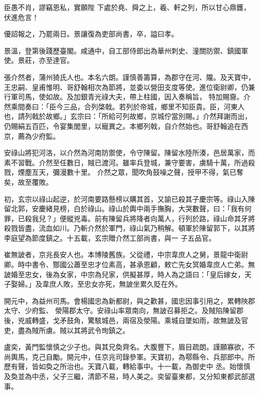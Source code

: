 \begin{pinyinscope}
 臣愚不肖，謬竊恩私，實願陛
 下處於堯、舜之上，羲、軒之列，所以甘心鼎鑊，伏進危言！



 優詔報之，乃罷兩日。景讓復為吏部尚書，卒，謚曰孝。



 景溫，登第後踐歷臺閣。咸通中，自工部侍郎出為華州刺史、潼關防禦、鎮國軍使。景莊，亦至達官。



 張介然者，蒲州猗氏人也。本名六朗。謹慎善籌算，為郡守在河、隴。及天寶中，王忠嗣、皇甫惟明、哥舒翰相次為節將，並委以營田支度等使。進位衛尉卿，仍兼行軍司馬，使如故。及加銀青光祿大夫，帶上柱國，因入奏稱旨，
 特加賜齎。介然乘間奏曰：「臣今三品，合列棨戟。若列於帝城，鄉里不知臣貴。臣，河東人也，請列戟於故鄉。」玄宗曰：「所給可列故鄉，京城佇當別賜。」介然拜謝而出，仍賜絹五百匹，令宴集閭里，以寵異之。本鄉列戟，自介然始也。哥舒翰追在西京，薦為少府監。



 安祿山將犯河洛，以介然為河南防禦使，令守陳留。陳留水陸所湊，邑居萬家，而素不習戰。介然至任數日，賊已渡河。雖率兵登城，兼守要害，虜騎十萬，所過殺戮，煙塵亙天，彌漫數十里。
 介然之眾，聞吹角鼓噪之聲，授甲不得，氣已奪矣，故至覆敗。



 初，玄宗以祿山起逆，於河南要路懸榜以購其首，又諭已殺其子慶宗等。祿山入陳留北郭，安慶緒見榜，白於祿山。祿山於輿中兩手撫胸，大哭數聲，曰：「我有何罪，已殺我兒？」便縱兇毒。前有陳留兵將降者向萬人，行列於路，祿山命其牙將殺戮皆盡，流血如川。乃斬介然於軍門，祿山氣乃稍解。頓軍於陳留郭下，以其將李庭望為節度鎮之。十五載，玄宗贈介然工部尚書，與一
 子五品官。



 崔無詖者，京兆長安人也。本博陵舊族。父從禮，中宗韋庶人之舅，景龍中衛尉卿。時中書令、酂國公蕭至忠才位素高，甚承恩顧，敕亡先女冥婚韋庶人亡弟。無詖婚至忠女，後為女家，中宗為兒家，供擬甚厚，時人為之語曰：「皇后嫁女，天子娶婦。」及韋庶人敗，至忠女亦死，無詖坐累久貶在外。



 開元中，為益州司馬。會楊國忠為新都尉，與之歡甚，國忠因事引用之，累轉陜郡太守、少府監、
 滎陽郡太守。安祿山率眾南向，無詖召募拒之。及賊陷陳留郡後，兇威轉盛，戈矛鼓角，驚駭城邑，兩宿及滎陽。乘城自墜如雨，故無詖及官吏，盡為賊所虜。賊以其將武令珣鎮之。



 盧奕，黃門監懷慎之少子也。與其兄奐齊名。大腹豐下，眉目疏朗。謹願寡欲，不尚輿馬，克己自勵。開元中，任京兆司錄參軍。天寶初，為鄠縣令、兵部郎中。所歷有聲，皆如奐之所治也。天寶八載，轉給事中。十一載，為御史中
 丞。始懷慎及奐並為中丞，父子三繼，清節不易，時人美之。奕留臺東都，又分知東都武部選事。




\end{pinyinscope}
